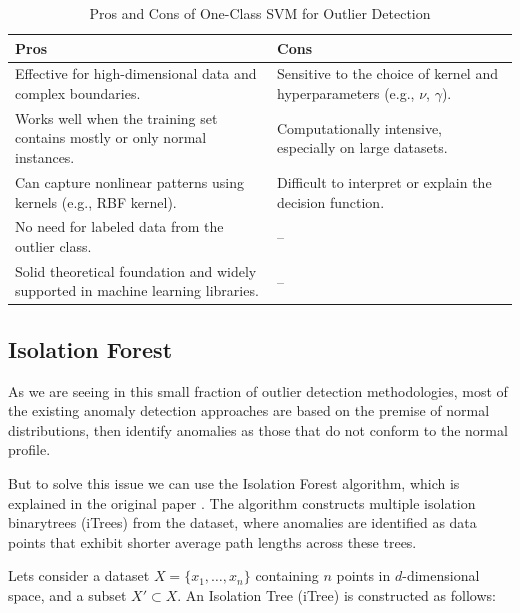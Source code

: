 \documentclass[11pt,english,a4paper,hidelinks]{book}
\begin{document}
\begin{table}[H]
    \centering
    \begin{tabular}{|p{7cm}|p{7cm}|}
        \hline
        \textbf{Pros} & \textbf{Cons} \\
            \hline
            Effective for high-dimensional data and complex boundaries. & Sensitive to the choice of kernel and hyperparameters (e.g., \(\nu\), \(\gamma\)). \\
            \hline
            Works well when the training set contains mostly or only normal instances. & Computationally intensive, especially on large datasets. \\
            \hline
            Can capture nonlinear patterns using kernels (e.g., RBF kernel). & Difficult to interpret or explain the decision function. \\
            \hline
            No need for labeled data from the outlier class. & -- \\
            \hline
            Solid theoretical foundation and widely supported in machine learning libraries. & -- \\
        \hline
    \end{tabular}
    \caption{Pros and Cons of One-Class SVM for Outlier Detection}
\end{table}
    
    
\subsection{Isolation Forest}

As we are seeing in this small fraction of outlier detection methodologies, most of the existing anomaly detection approaches are based on the premise of normal distributions, then identify anomalies as those that do not conform to the normal profile.

\vspace{0.5cm}
\noindent But to solve this issue we can use the Isolation Forest algorithm, which is explained in the original paper \textcite{liu2012isolation}. The algorithm constructs multiple isolation binarytrees (iTrees) from the dataset, where anomalies are identified as data points that exhibit shorter average path lengths across these trees.

\vspace{0.5cm}
\noindent Lets consider a dataset $X = \{x_1, \dots, x_n\}$ containing $n$ points in $d$-dimensional space, and a subset $X' \subset X$. An Isolation Tree (iTree) is constructed as follows:
\end{document}
